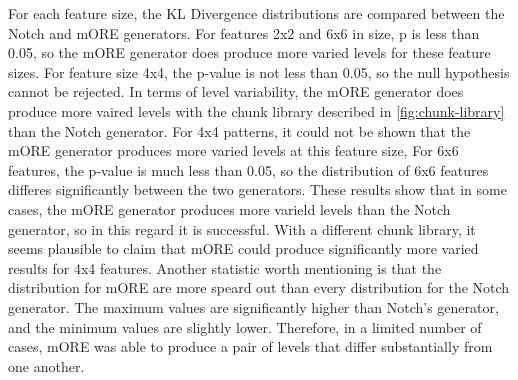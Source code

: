 For each feature size, the KL Divergence distributions are compared between the Notch and 
mORE generators. For features 2x2 and 6x6 in size, p is less than 0.05, so the mORE
generator does produce more varied levels for these feature sizes. For feature size 4x4,
the p-value is not less than 0.05, so the null hypothesis cannot be rejected. In terms of
level variability, the mORE generator does produce more vaired levels with the chunk library
described in \autoref{fig:chunk-library} than the Notch generator. For 4x4 patterns, it could
not be shown that the mORE generator produces more varied levels at this feature size,
For 6x6 features, the p-value is much less than 0.05, so the distribution of 6x6 features
differes significantly between the two generators. These results show that in some cases,
the mORE generator produces more varield levels than the Notch generator, so in this regard
it is successful. With a different chunk library, it seems plausible to claim that mORE could
produce significantly more varied results for 4x4 features. Another statistic worth 
mentioning is that the distribution for mORE are more speard out than every distribution for
the Notch generator. The maximum values are significantly higher than Notch's generator, and
the minimum values are slightly lower. Therefore, in a limited number of cases, mORE was 
able to produce a pair of levels that differ substantially from one another.

%
%

